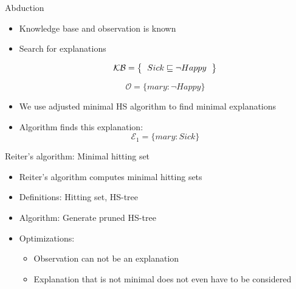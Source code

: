 \documentclass{beamer}
\begin{document}
\begin{frame}{Abduction}
	\begin{itemize}
		
		\item {
			Knowledge base and observation is known
		}
		
		\item {
			Search for explanations
		}
		
		\[ 
		\mathcal{KB} = \left\{
		\begin{tabular}{l c}
		$Sick \sqsubseteq \neg Happy$ \\
		\end{tabular}
		\right \}
		\]
		
		\[ \mathcal{O} = \{ mary: \neg Happy \} \]
		
		\item {
			We use adjusted minimal HS algorithm to find minimal explanations
		}
		
		\item {
			Algorithm finds this explanation: 
			\[ \mathcal{E}_{1} = \{ mary: Sick \} \]
		}
	\end{itemize}
\end{frame}

\begin{frame}{Reiter's algorithm: Minimal hitting set}
	\begin{itemize}
		
		\item {
			Reiter's algorithm computes minimal hitting sets
		}
		
		\item {
			Definitions: Hitting set, HS-tree
		}
		
		\item {
			Algorithm: Generate pruned HS-tree
		}
		
		\item {
			Optimizations: 
			\begin{itemize}
				\item Observation can not be an explanation
				\item Explanation that is not minimal does not even have to be considered
			\end{itemize}
		}
		
	\end{itemize}
\end{frame}
\end{document}
